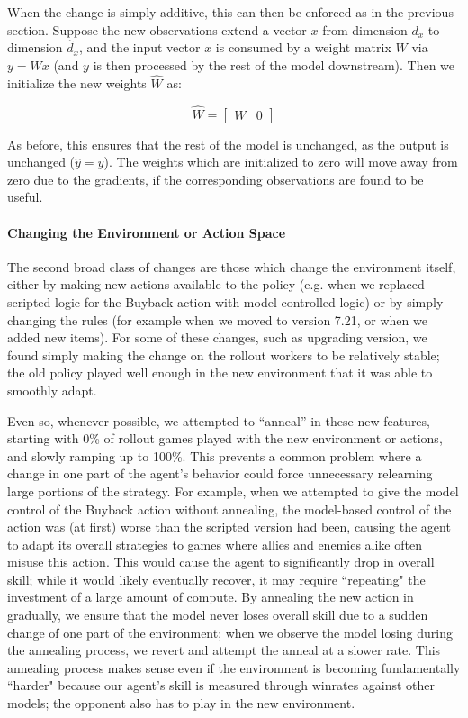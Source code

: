 \documentclass[ocean-paper.tex]{subfiles}
\begin{document}
When the change is simply additive, this can then be enforced as in the previous section. Suppose the new observations extend a vector $x$ from dimension $d_x$ to dimension $\hat{d}_x$, and the input vector $x$ is consumed by a weight matrix $W$ via $y=Wx$ (and $y$ is then processed by the rest of the model downstream). Then we initialize the new weights $\hat W$ as:

\begin{equation}
\hat{W} = \left[
\begin{array}{cc}
W & 0
\end{array}
\right]
\end{equation}

As before, this ensures that the rest of the model is unchanged, as the output is unchanged ($\hat y=y$). 
The weights which are initialized to zero will move away from zero due to the gradients, if the corresponding observations are found to be useful.

\paragraph{Changing the Environment or Action Space}
The second broad class of changes are those which change the environment itself, either by making new actions available to the policy (e.g. when we replaced scripted logic for the Buyback action with model-controlled logic) or by simply changing the \dota rules (for example when we moved to \dota version 7.21, or when we added new items). For some of these changes, such as upgrading \dota version, we found simply making the change on the rollout workers to be relatively stable; the old policy played well enough in the new environment that it was able to smoothly adapt.

Even so, whenever possible, we attempted to ``anneal'' in these new features, starting with 0\% of rollout games played with the new environment or actions, and slowly ramping up to 100\%.
This prevents a common problem where a change in one part of the agent's behavior could force unnecessary relearning large portions of the strategy. 
For example, when we attempted to give the model control of the Buyback action without annealing, the model-based control of the action was (at first) worse than the scripted version had been, causing the agent to adapt its overall strategies to games where allies and enemies alike often misuse this action.
This would cause the agent to significantly drop in overall skill; while it would likely eventually recover, it may require ``repeating" the investment of a large amount of compute.
By annealing the new action in gradually, we ensure that the model never loses overall skill due to a sudden change of one part of the environment; when we observe the model losing \trueskillname during the annealing process, we revert and attempt the anneal at a slower rate.
This annealing process makes sense even if the environment is becoming fundamentally ``harder" because our agent's skill is measured through winrates against other models; the opponent also has to play in the new environment.
\end{document}

